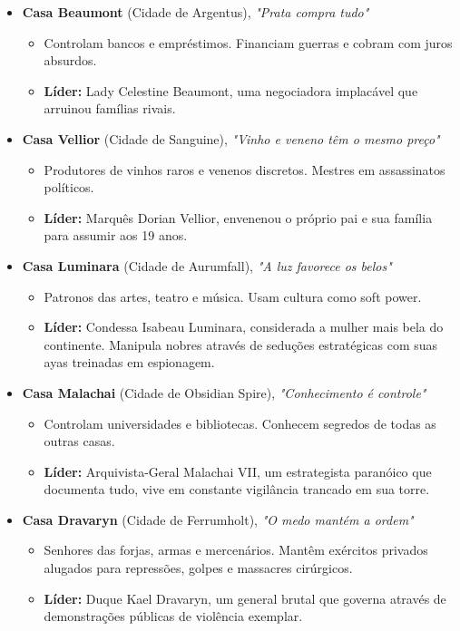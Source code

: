 \begin{itemize}
    \item \textbf{\ringmfamily Casa Beaumont} (Cidade de Argentus), \textit{"Prata compra tudo"}
    \begin{itemize}
        \item Controlam bancos e empréstimos. Financiam guerras e cobram com juros absurdos.
        \item \textbf{\ringmfamily Líder:} Lady Celestine Beaumont, uma negociadora implacável que arruinou famílias rivais.
    \end{itemize}
    \item \textbf{\ringmfamily Casa Vellior} (Cidade de Sanguine), \textit{"Vinho e veneno têm o mesmo preço"}
    \begin{itemize}
        \item Produtores de vinhos raros e venenos discretos. Mestres em assassinatos políticos.
        \item \textbf{\ringmfamily Líder:} Marquês Dorian Vellior, envenenou o próprio pai e sua família para assumir aos 19 anos.
    \end{itemize}
    \item \textbf{\ringmfamily Casa Luminara} (Cidade de Aurumfall), \textit{"A luz favorece os belos"}
    \begin{itemize}
        \item Patronos das artes, teatro e música. Usam cultura como soft power.
        \item \textbf{\ringmfamily Líder:} Condessa Isabeau Luminara, considerada a mulher mais bela do continente. Manipula nobres através de seduções estratégicas com suas ayas treinadas em espionagem.
    \end{itemize}
    \item \textbf{\ringmfamily Casa Malachai} (Cidade de Obsidian Spire), \textit{"Conhecimento é controle"}
    \begin{itemize}
        \item Controlam universidades e bibliotecas. Conhecem segredos de todas as outras casas.
        \item \textbf{\ringmfamily Líder:} Arquivista-Geral Malachai VII, um estrategista paranóico que documenta tudo, vive em constante vigilância trancado em sua torre.
    \end{itemize}

    \item \textbf{\ringmfamily Casa Dravaryn} (Cidade de Ferrumholt), \textit{"O medo mantém a ordem"}
    \begin{itemize}
        \item Senhores das forjas, armas e mercenários. Mantêm exércitos privados alugados para repressões, golpes e massacres cirúrgicos.
        \item \textbf{\ringmfamily Líder:} Duque Kael Dravaryn, um general brutal que governa através de demonstrações públicas de violência exemplar.
    \end{itemize}
    

\end{itemize}
